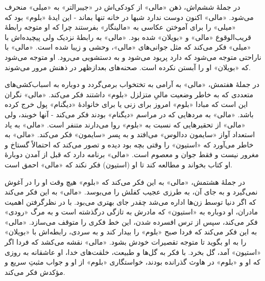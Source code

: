 \documentclass[12pt]{book}
\newcommand{\noun}[1]{«{#1}»}
\begin{document}
    در جملۀ ششم‌اش، ذهن \noun{مالی} از کودکی‌اش در \noun{جیبرالتر} به \noun{میلی} منحرف می‌شود. \noun{مالی} اکنون دوست ندارد شبها در خانه تنها بماند - این ایدۀ \noun{بلوم} بود که \noun{میلی} را برای آموختن عکاسی به \noun{مالینگار} بفرستند چرا که او متوجه رابطۀ قریب‌الوقوع \noun{مالی} و \noun{بویلان} شده بود. \noun{مالی} به رابطۀ نزدیک ولی پیچیده‌اش با \noun{میلی} فکر می‌کند که مثل جوانی‌های \noun{مالی}، وحشی و زیبا شده است. \noun{مالی} با ناراحتی متوجه می‌شود که دارد پریود می‌شود و به دستشویی می‌رود. او متوجه می‌شود که \noun{بویلان} او را آبستن نکرده است. صحنه‌های بعدازظهر در ذهنش مرور می‌شوند.

    در جملۀ هفتمش، \noun{مالی} به آرامی به تختخواب برمی‌گردد و دوباره به اسباب‌کشی‌های متعددی که به خاطر وضعیت مالیِ متزلزل \noun{بلوم} داشتند فکر می‌کند. \noun{مالی} نگران این است که مبادا \noun{بلوم} امروز برای زنی یا برای خانوادۀ \noun{دیگنام} پول خرج کرده باشد. \noun{مالی} به مردهایی که در مراسم \noun{دیگنام} بودند فکر می‌کند - آنها خوبند، ولی \noun{مالی} از تحقیرهایی که نسبت به \noun{بلوم} روا می‌دارند متنفر است. \noun{مالی} به یاد استعداد آواز \noun{سایمون ددالوس‬} می‌افتد و به پسر \noun{سایمون}  فکر می‌کند. \noun{مالی} به خاطر می‌آورد که \noun{استیون} را وقتی بچه بود دیده و تصور می‌کند که احتمالاً گستاخ و مغرور نیست و فقط جوان و معصوم است. \noun{مالی} برنامه دارد که قبل از آمدن دوبارۀ او کتاب بخواند و مطالعه کند تا او (استیون) فکر نکند که \noun{مالی} احمق است.

    در جملۀ هشتمش، \noun{مالی} به این فکر می‌کند که \noun{بلوم} هیچ وقت او را در آغوش نمی‌گیرد و به جای آن، به طرزی عجیب کفلش را می‌بوسد. \noun{مالی} به این فکر می‌کند که اگر دنیا توسط زن‌ها اداره می‌شد چقدر جای بهتری می‌بود. با در نظرگرفتن اهمیت مادران، او دوباره به \noun{استیون} که مادرش به تازگی درگذشته است و به مرگ \noun{رودی} فکر می‌کند، سپس از ترس افسرده شدن، این خط فکری را متوقف می‌سازد. \noun{مالی} به این فکر می‌کند که فردا صبح \noun{بلوم} را بیدار کند و به سردی، رابطه‌اش با \noun{بویلان} را به او بگوید تا متوجه تقصیرات خودش بشود. \noun{مالی} نقشه می‌کشد که فردا اگر \noun{استیون} آمد، گل بخرد. با فکر به گل‌ها و طبیعت، خلقت‌های خدا، او عاشقانه به روزی که او و \noun{بلوم} در هاوث گذرانده بودند، خواستگاری‌ \noun{بلوم} از او و جواب مثبتِ سریع و مؤکدش فکر می‌کند.
\end{document}

